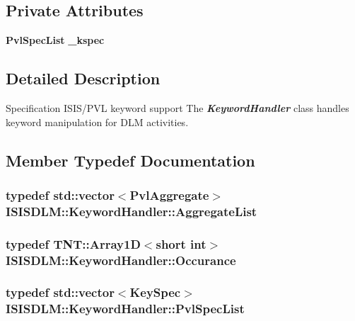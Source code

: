 \subsection*{Private Attributes}
\begin{CompactItemize}
\item 
{\bf Pvl\-Spec\-List} {\bf \_\-kspec}
\end{CompactItemize}


\subsection{Detailed Description}
Specification ISIS/PVL keyword support The {\em {\bf Keyword\-Handler}\/} class handles keyword manipulation for DLM activities. 



\subsection{Member Typedef Documentation}
\subsubsection{\setlength{\rightskip}{0pt plus 5cm}typedef std::vector$<${\bf Pvl\-Aggregate}$>$ {\bf ISISDLM::Keyword\-Handler::Aggregate\-List}\hspace{0.3cm}{\tt  [private]}}\label{classISISDLM_1_1KeywordHandler_y2}


\subsubsection{\setlength{\rightskip}{0pt plus 5cm}typedef TNT::Array1D$<$short int$>$ {\bf ISISDLM::Keyword\-Handler::Occurance}}\label{classISISDLM_1_1KeywordHandler_w0}


\subsubsection{\setlength{\rightskip}{0pt plus 5cm}typedef std::vector$<${\bf Key\-Spec}$>$ {\bf ISISDLM::Keyword\-Handler::Pvl\-Spec\-List}\hspace{0.3cm}{\tt  [private]}}\label{classISISDLM_1_1KeywordHandler_y0}


